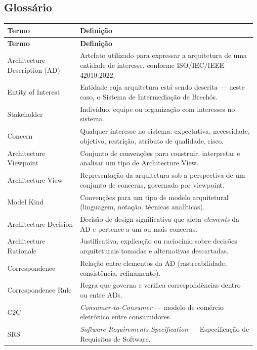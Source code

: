 \documentclass[12pt, a4paper]{article}
\begin{document}
\subsection{Glossário}

\begin{longtable}{|p{4.5cm}|p{10cm}|}
\hline
\textbf{Termo} & \textbf{Definição} \\
\hline
\endfirsthead
\hline
\textbf{Termo} & \textbf{Definição} \\
\hline
\endhead
Architecture Description (AD) & Artefato utilizado para expressar a arquitetura de uma entidade de interesse, conforme ISO/IEC/IEEE 42010:2022. \\
\hline
Entity of Interest & Entidade cuja arquitetura está sendo descrita --- neste caso, o Sistema de Intermediação de Brechós. \\
\hline
Stakeholder & Indivíduo, equipe ou organização com interesses no sistema. \\
\hline
Concern & Qualquer interesse no sistema: expectativa, necessidade, objetivo, restrição, atributo de qualidade, risco. \\
\hline
Architecture Viewpoint & Conjunto de convenções para construir, interpretar e analisar um tipo de Architecture View. \\
\hline
Architecture View & Representação da arquitetura sob a perspectiva de um conjunto de concerns, governada por viewpoint. \\
\hline
Model Kind & Convenções para um tipo de modelo arquitetural (linguagem, notação, técnicas analíticas). \\
\hline
Architecture Decision & Decisão de design significativa que afeta \textit{elements} da AD e pertence a um ou mais concerns. \\
\hline
Architecture Rationale & Justificativa, explicação ou raciocínio sobre decisões arquiteturais tomadas e alternativas descartadas. \\
\hline
Correspondence & Relação entre elementos da AD (rastreabilidade, consistência, refinamento). \\
\hline
Correspondence Rule & Regra que governa e verifica correspondências dentro ou entre ADs. \\
\hline
C2C & \textit{Consumer-to-Consumer} --- modelo de comércio eletrônico entre consumidores. \\
\hline
SRS & \textit{Software Requirements Specification} --- Especificação de Requisitos de Software. \\
\hline
\end{longtable}
\end{document}

